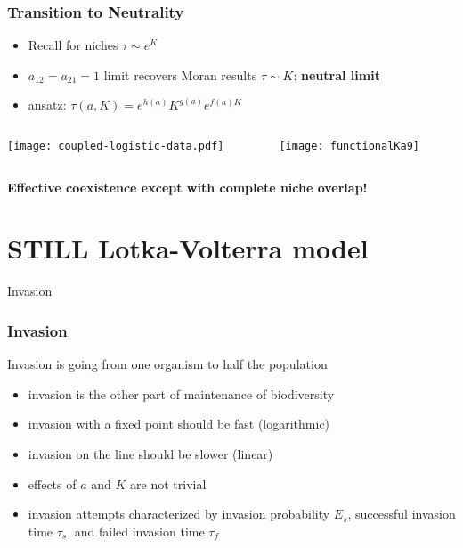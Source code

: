 \documentclass{beamer}
\begin{document}
\begin{frame}
\frametitle{Transition to Neutrality}
\begin{itemize}
	\item Recall for niches $\tau \sim e^K$
	\item $a_{12}=a_{21}=1$ limit recovers Moran results $\tau \sim K$: \textbf{neutral limit}%
	\pause
	\item ansatz: $\tau(a,K) = e^{h(a)}K^{g(a)}e^{f(a)K}$
\end{itemize}
\pause
\begin{columns}
	\begin{column}{5cm}
		\begin{center}
			\texttt{[image: coupled-logistic-data.pdf]}
		\end{center}
	\end{column}
\pause
	\begin{column}{6cm}
		\begin{center}
		\texttt{[image: functionalKa9]}
		\end{center}
	\end{column}
\end{columns}
\pause
\textbf{Effective coexistence except with complete niche overlap!}
\end{frame}



\section[Invasion]{STILL Lotka-Volterra model}

\begin{frame}
\centering
{{\Huge Invasion}}
\end{frame}


\begin{frame}
\frametitle{Invasion}
Invasion is going from one organism to half the population
\begin{itemize}
	\item invasion is the other part of maintenance of biodiversity
	\pause
	\item invasion with a fixed point should be fast (logarithmic)
	\pause
	\item invasion on the line should be slower (linear)
	\pause
	\item effects of $a$ and $K$ are not trivial
	\pause
	\item invasion attempts characterized by invasion probability $E_s$, successful invasion time $\tau_s$, and failed invasion time $\tau_f$
\end{itemize}
\end{frame}
\end{document}
